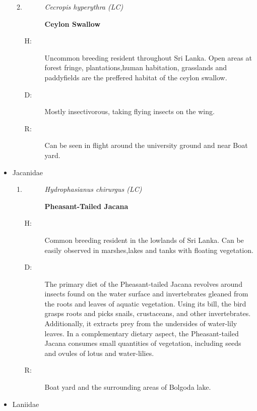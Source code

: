 \begin{itemize}
\begin{enumerate}
\begin{description}
\end{description}%
\item%
\begin{description}%
\item[]%
\textit{Cecropis hyperythra (LC)}%
\item[]%
\textbf{Ceylon Swallow}%
\end{description}%
\begin{description}%
\item[H: ]%
Uncommon breeding resident throughout Sri Lanka. Open areas at forest fringe, plantations,human habitation, grasslands and paddyfields are the preffered habitat of the ceylon swallow.%
\item[D: ]%
Mostly insectivorous, taking flying insects on the wing.%
\item[R: ]%
Can be seen in flight around the university ground and near Boat yard.%
\end{description}%
\end{enumerate}%
\item%
Jacanidae%
\begin{enumerate}%
\item%
\begin{description}%
\item[]%
\textit{Hydrophasianus chirurgus (LC)}%
\item[]%
\textbf{Pheasant{-}Tailed Jacana}%
\end{description}%
\begin{description}%
\item[H: ]%
Common breeding resident in the lowlands of Sri Lanka. Can be easily observed in marshes,lakes and tanks with floating vegetation.%
\item[D: ]%
The primary diet of the Pheasant{-}tailed Jacana revolves around insects found on the water surface and invertebrates gleaned from the roots and leaves of aquatic vegetation. Using its bill, the bird grasps roots and picks snails, crustaceans, and other invertebrates. Additionally, it extracts prey from the undersides of water{-}lily leaves. In a complementary dietary aspect, the Pheasant{-}tailed Jacana consumes small quantities of vegetation, including seeds and ovules of lotus and water{-}lilies.%
\item[R: ]%
Boat yard and the surrounding areas of Bolgoda lake.%
\end{description}%
\end{enumerate}%
\item%
Laniidae%
\begin{enumerate}%

\end{enumerate}
\end{itemize}
